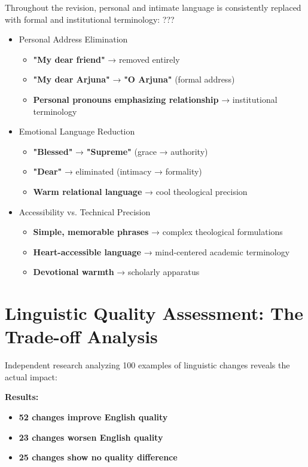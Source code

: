 \documentclass[11pt,twoside]{book}
\begin{document}
Throughout the revision, personal and intimate language is consistently replaced with formal and institutional terminology:
???
\begin{itemize}
\item Personal Address Elimination
\label{sec:orgc57d97a}
\begin{itemize}
\item \textbf{\textbf{"My dear friend"}} → removed entirely
\item \textbf{\textbf{"My dear Arjuna"}} → \textbf{\textbf{"O Arjuna"}} (formal address)
\item \textbf{\textbf{Personal pronouns emphasizing relationship}} → institutional terminology
\end{itemize}

\newpage
\item Emotional Language Reduction
\label{sec:org9c203bd}
\begin{itemize}
\item \textbf{\textbf{"Blessed"}} → \textbf{\textbf{"Supreme"}} (grace → authority)
\item \textbf{\textbf{"Dear"}} → eliminated (intimacy → formality)
\item \textbf{\textbf{Warm relational language}} → cool theological precision
\end{itemize}
\item Accessibility vs. Technical Precision
\label{sec:org9f8e6a5}
\begin{itemize}
\item \textbf{\textbf{Simple, memorable phrases}} → complex theological formulations
\item \textbf{\textbf{Heart-accessible language}} → mind-centered academic terminology
\item \textbf{\textbf{Devotional warmth}} → scholarly apparatus
\end{itemize}
\end{itemize}
\section*{Linguistic Quality Assessment: The Trade-off Analysis}
\label{sec:org7bad5e3}

Independent research analyzing 100 examples of linguistic changes reveals the actual impact:

\textbf{\textbf{Results:}}
\begin{itemize}
\item \textbf{\textbf{52 changes improve English quality}}
\item \textbf{\textbf{23 changes worsen English quality}}
\item \textbf{\textbf{25 changes show no quality difference}}
\end{itemize}
\end{document}
